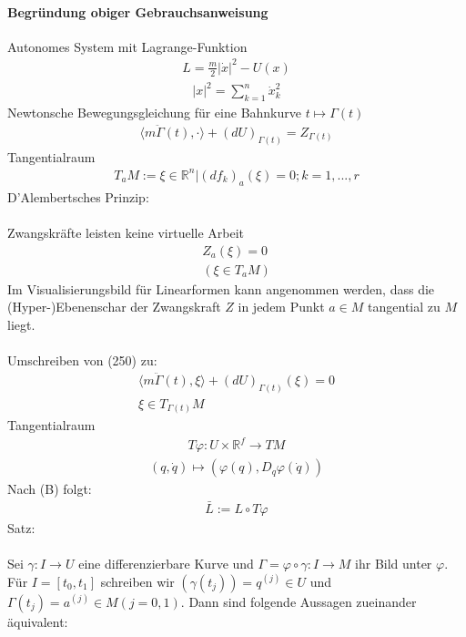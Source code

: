 \documentclass[10pt,a4paper]{article}
\begin{document}
\paragraph{Begründung obiger Gebrauchsanweisung} $\,$ \\
Autonomes System mit Lagrange-Funktion
\begin{align}
L= \frac{m}{2} \vert \dot{x} \vert^2-U(x)
\end{align}
\begin{align}
\vert x \vert^2= \sum_{k=1}^n \dot{x}_k^2
\end{align}
Newtonsche Bewegungsgleichung für eine Bahnkurve $ t \longmapsto \Gamma (t)$
\begin{align}
\langle m \ddot{\Gamma} (t), \cdot \rangle + (dU)_{\Gamma (t)} = Z_{\Gamma (t)}
\end{align}
Tangentialraum
\begin{align}
T_aM := { \xi \in \mathbb{R}^n \vert (df_k)_a (\xi) =0; k=1,...,r}
\end{align}
D'Alembertsches Prinzip:\\
\\
Zwangskräfte leisten keine virtuelle Arbeit
\begin{align}
Z_a (\xi)=0 \\
(\xi \in T_aM)
\end{align}
Im Visualisierungsbild für Linearformen kann angenommen werden, dass die (Hyper-)Ebenenschar der Zwangskraft $Z$ in jedem Punkt $ a \in M$ tangential zu $M$ liegt.\\
\\
Umschreiben von (250) zu:
\begin{align}
\langle m \ddot{\Gamma}(t), \xi \rangle + (dU)_{\Gamma (t)} (\xi)=0 \\
\xi \in T_{\Gamma (t)}M
\end{align}
Tangentialraum
\begin{align}
T \varphi : U \times \mathbb{R}^f \longrightarrow TM
\end{align}
\begin{align}
(q, \dot{q}) \longmapsto (\varphi (q), D_q \varphi(\dot{q}))
\end{align}
Nach (B) folgt:
\begin{align}
\bar{L} := L \circ T \varphi
\end{align}
Satz:\\
\\
Sei $\gamma : I \longrightarrow U $ eine differenzierbare Kurve und $ \Gamma = \varphi  \circ \gamma : I \longrightarrow M $ ihr Bild unter $ \varphi $. Für $ I=[t_0,t_1] $ schreiben wir $ (\gamma (t_j))=q^{(j)} \in U $ und $ \Gamma (t_j)=a^{(j)} \in M (j=0,1) $. Dann sind folgende Aussagen zueinander äquivalent:\\
\end{document}
